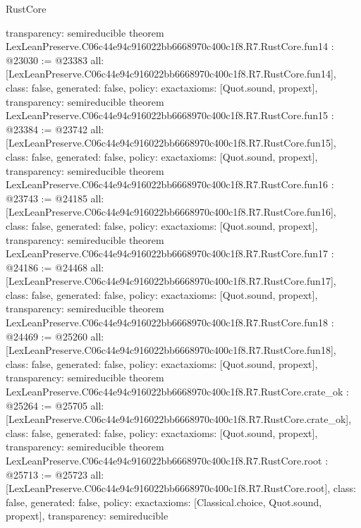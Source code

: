 \begin{lexlean}{RustCore}
\begin{coremodule}
{  transparency: semireducible
}
theorem LexLeanPreserve.C06c44e94c916022bb6668970c400c1f8.R7.RustCore.fun14 : @23030 := @23383 {
  all: [LexLeanPreserve.C06c44e94c916022bb6668970c400c1f8.R7.RustCore.fun14],
  class: false,
  generated: false,
  policy: exact{axioms: [Quot.sound, propext]},
  transparency: semireducible
}
theorem LexLeanPreserve.C06c44e94c916022bb6668970c400c1f8.R7.RustCore.fun15 : @23384 := @23742 {
  all: [LexLeanPreserve.C06c44e94c916022bb6668970c400c1f8.R7.RustCore.fun15],
  class: false,
  generated: false,
  policy: exact{axioms: [Quot.sound, propext]},
  transparency: semireducible
}
theorem LexLeanPreserve.C06c44e94c916022bb6668970c400c1f8.R7.RustCore.fun16 : @23743 := @24185 {
  all: [LexLeanPreserve.C06c44e94c916022bb6668970c400c1f8.R7.RustCore.fun16],
  class: false,
  generated: false,
  policy: exact{axioms: [Quot.sound, propext]},
  transparency: semireducible
}
theorem LexLeanPreserve.C06c44e94c916022bb6668970c400c1f8.R7.RustCore.fun17 : @24186 := @24468 {
  all: [LexLeanPreserve.C06c44e94c916022bb6668970c400c1f8.R7.RustCore.fun17],
  class: false,
  generated: false,
  policy: exact{axioms: [Quot.sound, propext]},
  transparency: semireducible
}
theorem LexLeanPreserve.C06c44e94c916022bb6668970c400c1f8.R7.RustCore.fun18 : @24469 := @25260 {
  all: [LexLeanPreserve.C06c44e94c916022bb6668970c400c1f8.R7.RustCore.fun18],
  class: false,
  generated: false,
  policy: exact{axioms: [Quot.sound, propext]},
  transparency: semireducible
}
theorem LexLeanPreserve.C06c44e94c916022bb6668970c400c1f8.R7.RustCore.crate_ok : @25264 := @25705 {
  all: [LexLeanPreserve.C06c44e94c916022bb6668970c400c1f8.R7.RustCore.crate_ok],
  class: false,
  generated: false,
  policy: exact{axioms: [Quot.sound, propext]},
  transparency: semireducible
}
theorem LexLeanPreserve.C06c44e94c916022bb6668970c400c1f8.R7.RustCore.root : @25713 := @25723 {
  all: [LexLeanPreserve.C06c44e94c916022bb6668970c400c1f8.R7.RustCore.root],
  class: false,
  generated: false,
  policy: exact{axioms: [Classical.choice, Quot.sound, propext]},
  transparency: semireducible
}


\end{coremodule}
\end{lexlean}
